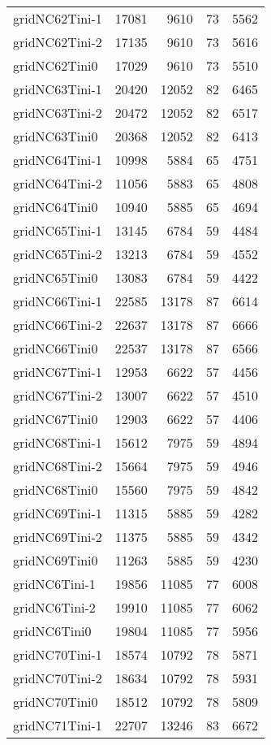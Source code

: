 \documentclass[../../../thesis.tex]{subfiles}
\begin{document}
\begin{longtable}{lrrrr}
gridNC62Tini-1 & 17081 & 9610 & 73 & 5562 \\
gridNC62Tini-2 & 17135 & 9610 & 73 & 5616 \\
gridNC62Tini0 & 17029 & 9610 & 73 & 5510 \\
gridNC63Tini-1 & 20420 & 12052 & 82 & 6465 \\
gridNC63Tini-2 & 20472 & 12052 & 82 & 6517 \\
gridNC63Tini0 & 20368 & 12052 & 82 & 6413 \\
gridNC64Tini-1 & 10998 & 5884 & 65 & 4751 \\
gridNC64Tini-2 & 11056 & 5883 & 65 & 4808 \\
gridNC64Tini0 & 10940 & 5885 & 65 & 4694 \\
gridNC65Tini-1 & 13145 & 6784 & 59 & 4484 \\
gridNC65Tini-2 & 13213 & 6784 & 59 & 4552 \\
gridNC65Tini0 & 13083 & 6784 & 59 & 4422 \\
gridNC66Tini-1 & 22585 & 13178 & 87 & 6614 \\
gridNC66Tini-2 & 22637 & 13178 & 87 & 6666 \\
gridNC66Tini0 & 22537 & 13178 & 87 & 6566 \\
gridNC67Tini-1 & 12953 & 6622 & 57 & 4456 \\
gridNC67Tini-2 & 13007 & 6622 & 57 & 4510 \\
gridNC67Tini0 & 12903 & 6622 & 57 & 4406 \\
gridNC68Tini-1 & 15612 & 7975 & 59 & 4894 \\
gridNC68Tini-2 & 15664 & 7975 & 59 & 4946 \\
gridNC68Tini0 & 15560 & 7975 & 59 & 4842 \\
gridNC69Tini-1 & 11315 & 5885 & 59 & 4282 \\
gridNC69Tini-2 & 11375 & 5885 & 59 & 4342 \\
gridNC69Tini0 & 11263 & 5885 & 59 & 4230 \\
gridNC6Tini-1 & 19856 & 11085 & 77 & 6008 \\
gridNC6Tini-2 & 19910 & 11085 & 77 & 6062 \\
gridNC6Tini0 & 19804 & 11085 & 77 & 5956 \\
gridNC70Tini-1 & 18574 & 10792 & 78 & 5871 \\
gridNC70Tini-2 & 18634 & 10792 & 78 & 5931 \\
gridNC70Tini0 & 18512 & 10792 & 78 & 5809 \\
gridNC71Tini-1 & 22707 & 13246 & 83 & 6672 \\

\end{longtable}
\end{document}
